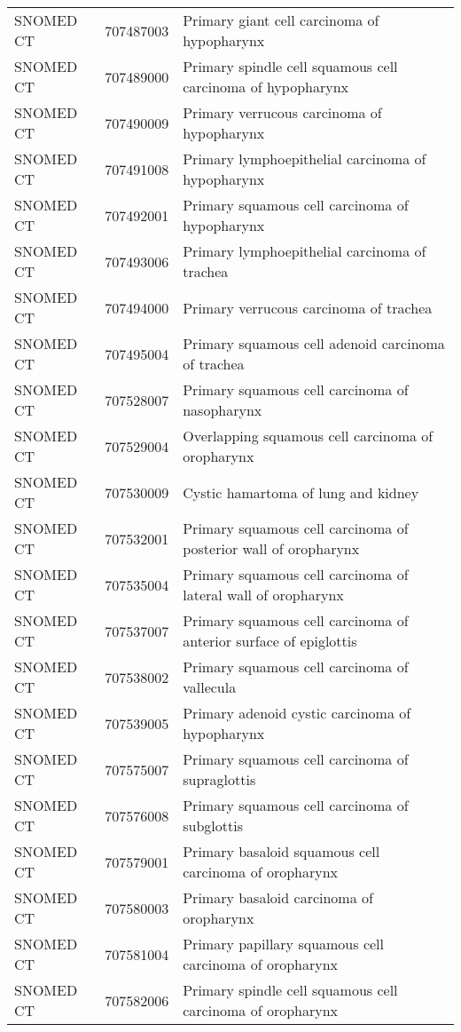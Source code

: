 \begin{longtable}{p{}p{}p{}}
  SNOMED CT & 707487003 & Primary giant cell carcinoma of hypopharynx \\ 
  SNOMED CT & 707489000 & Primary spindle cell squamous cell carcinoma of hypopharynx \\ 
  SNOMED CT & 707490009 & Primary verrucous carcinoma of hypopharynx \\ 
  SNOMED CT & 707491008 & Primary lymphoepithelial carcinoma of hypopharynx \\ 
  SNOMED CT & 707492001 & Primary squamous cell carcinoma of hypopharynx \\ 
  SNOMED CT & 707493006 & Primary lymphoepithelial carcinoma of trachea \\ 
  SNOMED CT & 707494000 & Primary verrucous carcinoma of trachea \\ 
  SNOMED CT & 707495004 & Primary squamous cell adenoid carcinoma of trachea \\ 
  SNOMED CT & 707528007 & Primary squamous cell carcinoma of nasopharynx \\ 
  SNOMED CT & 707529004 & Overlapping squamous cell carcinoma of oropharynx \\ 
  SNOMED CT & 707530009 & Cystic hamartoma of lung and kidney \\ 
  SNOMED CT & 707532001 & Primary squamous cell carcinoma of posterior wall of oropharynx \\ 
  SNOMED CT & 707535004 & Primary squamous cell carcinoma of lateral wall of oropharynx \\ 
  SNOMED CT & 707537007 & Primary squamous cell carcinoma of anterior surface of epiglottis \\ 
  SNOMED CT & 707538002 & Primary squamous cell carcinoma of vallecula \\ 
  SNOMED CT & 707539005 & Primary adenoid cystic carcinoma of hypopharynx \\ 
  SNOMED CT & 707575007 & Primary squamous cell carcinoma of supraglottis \\ 
  SNOMED CT & 707576008 & Primary squamous cell carcinoma of subglottis \\ 
  SNOMED CT & 707579001 & Primary basaloid squamous cell carcinoma of oropharynx \\ 
  SNOMED CT & 707580003 & Primary basaloid carcinoma of oropharynx \\ 
  SNOMED CT & 707581004 & Primary papillary squamous cell carcinoma of oropharynx \\ 
  SNOMED CT & 707582006 & Primary spindle cell squamous cell carcinoma of oropharynx \\ 

\end{longtable}
